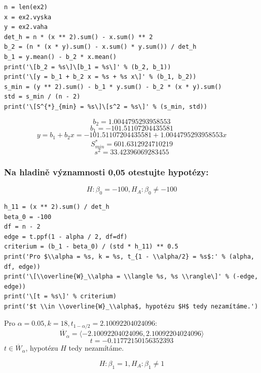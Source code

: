 \documentclass[11pt,titlepage]{article}
\begin{document}
\begin{listing}[htbp]
\begin{verbatim}
n = len(ex2)
x = ex2.vyska
y = ex2.vaha
det_h = n * (x ** 2).sum() - x.sum() ** 2
b_2 = (n * (x * y).sum() - x.sum() * y.sum()) / det_h
b_1 = y.mean() - b_2 * x.mean()
print('\[b_2 = %s\]\[b_1 = %s\]' % (b_2, b_1))
print('\[y = b_1 + b_2 x = %s + %s x\]' % (b_1, b_2))
s_min = (y ** 2).sum() - b_1 * y.sum() - b_2 * (x * y).sum()
std = s_min / (n - 2)
print('\[S^{*}_{min} = %s\]\[s^2 = %s\]' % (s_min, std))
\end{verbatim}
\end{listing}

\[b_2 = 1.0044795293958553\]\[b_1 = -101.51107204435581\]
\[y = b_1 + b_2 x = -101.51107204435581 + 1.0044795293958553 x\]
\[S^{*}_{min} = 601.6312924710219\]\[s^2 = 33.42396069283455\]
\newpage

\subsubsection{Na hladině významnosti 0,05 otestujte hypotézy:}
\label{sec:org4b17050}
\[H : \beta_0 = -100, H_A : \beta_0 \neq -100\]

\begin{listing}[htbp]
\begin{verbatim}
h_11 = (x ** 2).sum() / det_h
beta_0 = -100
df = n - 2
edge = t.ppf(1 - alpha / 2, df=df)
criterium = (b_1 - beta_0) / (std * h_11) ** 0.5
print('Pro $\\alpha = %s, k = %s, t_{1 - \\alpha/2} = %s$:' % (alpha, df, edge))
print('\[\\overline{W}_\\alpha = \\langle %s, %s \\rangle\]' % (-edge, edge))
print('\[t = %s\]' % criterium)
print('$t \\in \\overline{W}_\\alpha$, hypotézu $H$ tedy nezamítáme.')
\end{verbatim}
\end{listing}

Pro \(\alpha = 0.05, k = 18, t_{1 - \alpha/2} = 2.10092204024096\):
\[\overline{W}_\alpha = \langle -2.10092204024096, 2.10092204024096 \rangle\]
\[t = -0.11772150156352393\]
\(t \in \overline{W}_\alpha\), hypotézu \(H\) tedy nezamítáme.

\[H : \beta_1 = 1, H_A : \beta_1 \neq 1\]
\end{document}
